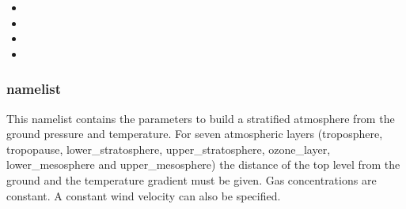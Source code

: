 \begin{itemize}
\item
{}

\item
{}

\item
{}

\item
{}
\end{itemize}

\subsubsection{ namelist}
This namelist contains the parameters to build a stratified atmosphere from
the ground pressure and temperature. For seven atmospheric layers (troposphere,
tropopause, lower\_stratosphere, upper\_stratosphere, ozone\_layer, lower\_mesosphere and upper\_mesosphere) the distance of the top level from the ground and the temperature gradient must be given. Gas concentrations are constant. A constant wind velocity can also be specified.

